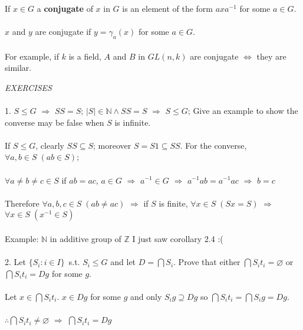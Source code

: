 \documentclass{article}
\begin{document}
If \(x\in G\) a \textbf{conjugate} of \(x\) in \(G\) is an element of the form \(axa^{-1}\) for some \(a\in G\).\\\\
\(x\) and \(y\) are conjugate if \(y=\gamma_{a}(x)\) for some \(a\in G\).\\\\
For example, if \(k\) is a field,  \(A\) and \(B\) in \(GL(n,k)\) are conjugate \(\Longleftrightarrow\) they are similar.
\begin{siderules}\color{blue}\textit{EXERCISES}\color{black}\\\\
\color{blue}1. \(S\le G\) \(\Longrightarrow\) \(SS=S\); \(|S|\in \mathbb{N}\land SS=S\) \(\Longrightarrow\) \(S\le G\); Give an example to show the converse may be false when \(S\) is infinite.\\\\\color{black}
\null\qquad If \(S\le G\), clearly \(SS\subseteq S\); moreover \(S=S1\subseteq SS\). For the converse, \(\forall a,b\in S\; (ab\in S)\);\\\\
\null\qquad \(\forall a\neq b\neq c\in S\) if \(ab=ac\), \(a\in G\) \(\Longrightarrow\) \(a^{-1}\in G\) \(\Longrightarrow\) \(a^{-1}ab=a^{-1}ac\) \(\Longrightarrow\) \(b=c\)\\\\
\null\qquad Therefore \(\forall a,b,c\in S\; (ab\neq ac)\) \(\Longrightarrow\) if \(S\) is finite, \(\forall x\in S\; (Sx=S)\) \(\Longrightarrow\) \(\forall x\in S\; (x^{-1}\in S)\)\\\\
\null\qquad Example: \(\mathbb{N}\) in additive group of \(\mathbb{Z}\) \color{gray}I just saw corollary 2.4 :(\color{black}\\\\
\color{blue}2. Let \(\{S_{i}:i\in I\}\)\ s.t. \(S_{i}\le G\) and let \(D=\bigcap S_i\). Prove that either \(\bigcap S_{i}t_{i}=\varnothing\) or \(\bigcap S_{i}t_{i}=Dg\) for some \(g\).\color{black}\\\\
\null\qquad Let \(x\in\bigcap S_{i}t_{i}\). \(x\in Dg\) for some \(g\) and only \(S_{i}g\supseteq Dg\) so \(\bigcap S_{i}t_{i}=\bigcap S_{i}g=Dg\).\\\\
\null\qquad \(\therefore \bigcap S_{i}t_{i}\neq \varnothing\) \(\Longrightarrow\) \(\bigcap S_{i}t_{i}=Dg\)\\\\

\end{siderules}
\end{document}
